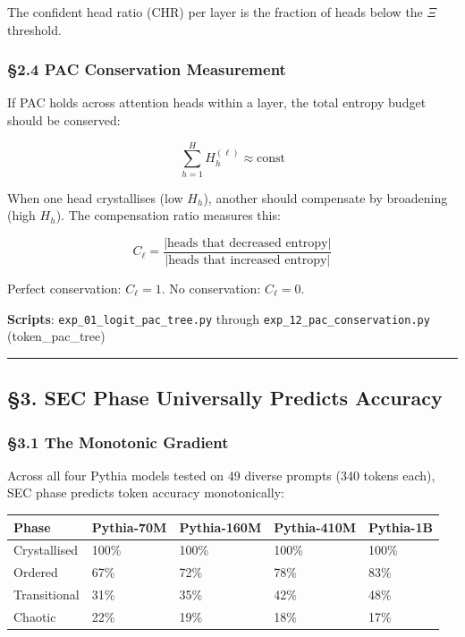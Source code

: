 \documentclass[
  11pt,
  a4paper]{article}
\begin{document}
The confident head ratio (CHR) per layer is the fraction of heads below
the \(\Xi\) threshold.

\subsubsection{§2.4 PAC Conservation
Measurement}\label{pac-conservation-measurement}

If PAC holds across attention heads within a layer, the total entropy
budget should be conserved:

\[\sum_{h=1}^{H} H_h^{(\ell)} \approx \text{const}\]

When one head crystallises (low \(H_h\)), another should compensate by
broadening (high \(H_h\)). The compensation ratio measures this:

\[C_\ell = \frac{|\text{heads that decreased entropy}|}{|\text{heads that increased entropy}|}\]

Perfect conservation: \(C_\ell = 1\). No conservation: \(C_\ell = 0\).

\textbf{Scripts}: \texttt{exp\_01\_logit\_pac\_tree.py} through
\texttt{exp\_12\_pac\_conservation.py} (token\_pac\_tree)

\begin{center}\rule{0.5\linewidth}{0.5pt}\end{center}

\subsection{§3. SEC Phase Universally Predicts
Accuracy}\label{sec-phase-universally-predicts-accuracy}

\subsubsection{§3.1 The Monotonic
Gradient}\label{the-monotonic-gradient}

Across all four Pythia models tested on 49 diverse prompts (340 tokens
each), SEC phase predicts token accuracy monotonically:

\begin{longtable}[]{@{}lllll@{}}
\toprule\noalign{}
Phase & Pythia-70M & Pythia-160M & Pythia-410M & Pythia-1B \\
\midrule\noalign{}
\endhead
\bottomrule\noalign{}
\endlastfoot
Crystallised & 100\% & 100\% & 100\% & 100\% \\
Ordered & 67\% & 72\% & 78\% & 83\% \\
Transitional & 31\% & 35\% & 42\% & 48\% \\
Chaotic & 22\% & 19\% & 18\% & 17\% \\
\end{longtable}
\end{document}
